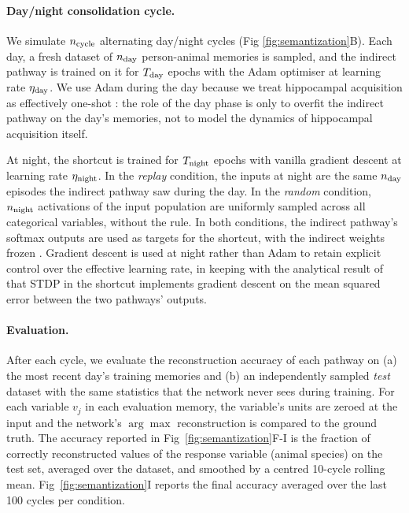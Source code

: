 \paragraph{Day/night consolidation cycle.}
We simulate $n_{\rm cycle}$ alternating day/night cycles (Fig
\ref{fig:semantization}B). Each day, a fresh dataset of $n_{\rm day}$
person-animal memories is sampled, and the indirect pathway is trained on
it for $T_{\rm day}$ epochs with the Adam optimiser \cite{Kingma2014} at
learning rate $\eta_{\rm day}$. We use Adam during the day because we treat
hippocampal acquisition as effectively one-shot \cite{Lee2015}: the role of
the day phase is only to overfit the indirect pathway on the day's
memories, not to model the dynamics of hippocampal acquisition itself.

At night, the shortcut is trained for $T_{\rm night}$ epochs with vanilla
gradient descent at learning rate $\eta_{\rm night}$. In the \emph{replay}
condition, the inputs at night are the same $n_{\rm day}$ episodes the
indirect pathway saw during the day. In the \emph{random} condition, $n_{\rm
night}$ activations of the input population are uniformly sampled across all
categorical variables, without the rule. In both conditions, the indirect
pathway's softmax outputs are used as targets for the shortcut, with the
indirect weights frozen \cite{Hasselmo1999a}. Gradient descent is used at
night rather than Adam to retain explicit control over the effective
learning rate, in keeping with the analytical result of \cite{Remme2021}
that STDP in the shortcut implements gradient descent on the mean squared
error between the two pathways' outputs.

\paragraph{Evaluation.}
After each cycle, we evaluate the reconstruction accuracy of each pathway
on (a) the most recent day's training memories and (b) an independently
sampled \emph{test} dataset with the same statistics that the network
never sees during training. For each variable $v_j$ in each evaluation
memory, the variable's units are zeroed at the input and the network's
$\arg\max$ reconstruction is compared to the ground truth. The accuracy
reported in Fig~\ref{fig:semantization}F-I is the fraction of correctly
reconstructed values of the response variable (animal species) on the test
set, averaged over the dataset, and smoothed by a centred 10-cycle rolling
mean. Fig~\ref{fig:semantization}I reports the final accuracy averaged
over the last 100 cycles per condition.

